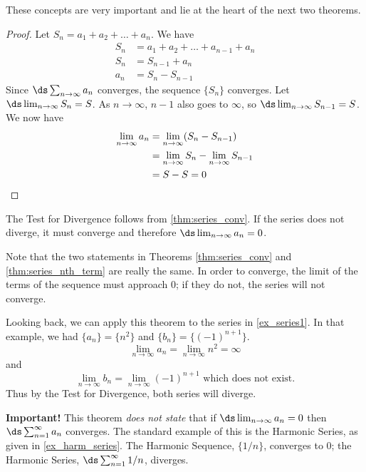 These concepts are very important and lie at the heart of the next two theorems.


\begin{proof}
Let $S_n=a_1+a_2+\dots+a_n$. We have 
\begin{align*}
S_n&=a_1+a_2+\dots+a_{n-1}+a_n\\
S_n&=S_{n-1}+a_n\\
a_n&=S_n-S_{n-1}
\end{align*}
Since  $\ds \sum_{n\to\infty}a_n$ converges, the sequence $\{ S_n\}$ converges.  Let $\ds \lim_{n\to\infty} S_n=S$. As $n\to \infty$, $n-1$ also goes to $\infty$, so $\ds \lim_{n\to\infty} S_{n-1}=S$. We now have
\begin{align*}
\lim_{n\to\infty} a_n&= \lim_{n\to\infty}(S_n-S_{n-1})\\
&= \lim_{n\to\infty}S_n - \lim_{n\to\infty} S_{n-1}\\
&=S-S=0\qedhere
\end{align*}
\end{proof}


The Test for Divergence follows from \autoref{thm:series_conv}. If the series does not diverge, it must converge and therefore $\ds  \lim_{n\to\infty}a_n=0$.

Note that the two statements in Theorems \ref{thm:series_conv} and \ref{thm:series_nth_term} are really the same. In order to converge, the limit of the terms of the sequence must approach 0; if they do not, the series will not converge. 

Looking back, we can apply this theorem to the series in \autoref{ex_series1}. In that example, we had $\{a_n\} = \{n^2\}$ and $\{b_n\} = \{(-1)^{n+1}\}$.
\[\lim_{n\to\infty} a_n=\lim_{n\to\infty} n^2=\infty\]
and
\[\lim_{n\to\infty} b_n=\lim_{n\to\infty}(-1)^{n+1}\text{ which does not exist.}\]
Thus by the Test for Divergence, both series will diverge.

\textbf{Important!} This theorem \emph{does not state} that if $\ds \lim_{n\to\infty} a_n = 0$ then $\ds \sum_{n=1}^\infty  a_n $ converges. The standard example of this is the Harmonic Series, as given in \autoref{ex_harm_series}. The Harmonic Sequence, $\{1/n\}$, converges to 0; the Harmonic Series, $\ds \sum_{n=1}^\infty 1/n$, diverges.

